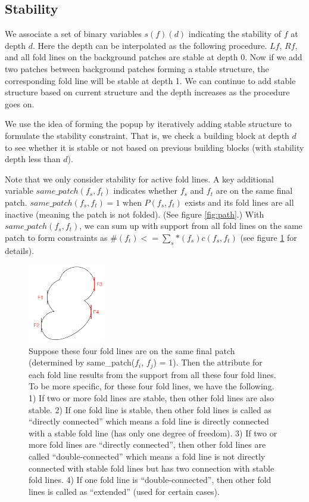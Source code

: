 \subsection{Stability}
We associate a set of binary variables $s(f)(d)$ indicating the stability of $f$ at depth $d$. Here the depth can be interpolated as the following procedure. $Lf$, $Rf$, and all fold lines on the background patches are stable at depth 0. Now if we add two patches between background patches forming a stable structure, the corresponding fold line will be stable at depth 1. We can continue to add stable structure based on current structure and the depth increases as the procedure goes on.

We use the idea of forming the popup by iteratively adding stable structure to formulate the stability constraint. That is, we check a building block at depth $d$ to see whether it is stable or not based on previous building blocks (with stability depth less than $d$).

Note that we only consider stability for active fold lines. A key additional variable $same\_patch(f_s, f_t)$ indicates whether $f_s$ and $f_t$ are on the same final patch. $same\_patch(f_s, f_t) = 1$ when $P(f_s, f_t)$ exists and its fold lines are all inactive (meaning the patch is not folded). (See figure \ref{fig:path}.) With $same\_patch(f_s, f_t)$, we can sum up with support from all fold lines on the same patch to form constraints as $\#(f_t) <= \sum_s{*(f_s)c(f_s, f_t)}$ (see figure \ref{fig:support} for details).

\begin{figure}[h]
  \includegraphics[width = 0.3\textwidth]{Figures/support}
  \caption{Suppose these four fold lines are on the same final patch (determined by same\_patch($f_i$, $f_j$) = 1). Then the attribute for each fold line results from the support from all these four fold lines. To be more specific, for these four fold lines, we have the following. 1) If two or more fold lines are stable, then other fold lines are also stable. 2) If one fold line is stable, then other fold lines is called as ``directly connected'' which means a fold line is directly connected with a stable fold line (has only one degree of freedom). 3) If two or more fold lines are ``directly connected'', then other fold lines are called ``double-connected'' which means a fold line is not directly connected with stable fold lines but has two connection with stable fold lines. 4) If one fold line is ``double-connected'', then other fold lines is called as ``extended'' (used for certain cases).}
  \label{fig:support}
\end{figure}

